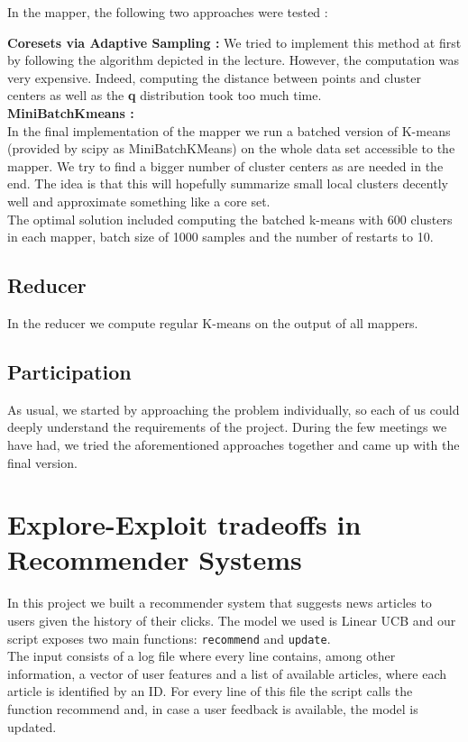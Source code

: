 \documentclass[a4paper, 11pt]{article}
\begin{document}
In the mapper, the following two approaches were tested :

\textbf{Coresets via Adaptive Sampling :} We tried to implement this method at first by following the algorithm depicted in the lecture. However, the computation was very expensive. Indeed, computing the distance between points and cluster centers as well as the \textbf{q} distribution took too much time. \\

\textbf{MiniBatchKmeans :}\\
In the final implementation of the mapper we run a batched version of K-means (provided by scipy as MiniBatchKMeans) on the whole data set accessible to the mapper. We try to find a bigger number
of cluster centers as are needed in the end. The idea is that this will hopefully
summarize small local clusters decently well and approximate something like a core set. \\

The optimal solution included computing the batched k-means with 600 clusters in each mapper, batch size of 1000 samples and the number of restarts to 10.

\subsection{Reducer}

In the reducer we compute regular K-means on the output of all mappers.

\subsection{Participation}

As usual, we started by approaching the problem individually, so each of us could deeply understand the requirements of the project. During the few meetings we have had, we tried the aforementioned approaches together and came up with the final version.


\newpage
\section{Explore-Exploit tradeoffs in Recommender Systems} 
In this project we built a recommender system that suggests news articles to users given the history of their clicks. 
The model we used is Linear UCB and our script exposes two main functions: \verb!recommend! and \verb!update!. \\
The input consists of a log file where every line contains, among other information, a vector of user features and a list of available articles, where each article is identified by an ID. For every line of this file the script calls the function recommend and, in case a user feedback is available, the model is updated.
\end{document}
